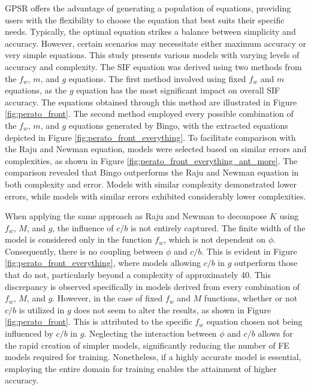 





GPSR offers the advantage of generating a population of equations, providing users with the flexibility to choose the equation that best suits their specific needs. Typically, the optimal equation strikes a balance between simplicity and accuracy. However, certain scenarios may necessitate either maximum accuracy or very simple equations. This study presents various models with varying levels of accuracy and complexity. The SIF equation was derived using two methods from the $f_w$, $m$, and $g$ equations. The first method involved using fixed $f_w$ and $m$ equations, as the $g$ equation has the most significant impact on overall SIF accuracy. The equations obtained through this method are illustrated in Figure \ref{fig:perato_front}. The second method employed every possible combination of the $f_w$, $m$, and $g$ equations generated by Bingo, with the extracted equations depicted in Figure \ref{fig:perato_front_everything}. To facilitate comparison with the Raju and Newman equation, models were selected based on similar errors and complexities, as shown in Figure \ref{fig:perato_front_everything_ant_more}. The comparison revealed that Bingo outperforms the Raju and Newman equation in both complexity and error. Models with similar complexity demonstrated lower errors, while models with similar errors exhibited considerably lower complexities.

When applying the same approach as Raju and Newman to decompose $K$ using $f_w$, $M$, and $g$, the influence of $c/b$ is not entirely captured. The finite width of the model is considered only in the function $f_w$, which is not dependent on $\phi$. Consequently, there is no coupling between $\phi$ and $c/b$. This is evident in Figure \ref{fig:perato_front_everything}, where models allowing $c/b$ in $g$ outperform those that do not, particularly beyond a complexity of approximately 40. This discrepancy is observed specifically in models derived from every combination of $f_w$, $M$, and $g$. However, in the case of fixed $f_w$ and $M$ functions, whether or not $c/b$ is utilized in $g$ does not seem to alter the results, as shown in Figure \ref{fig:perato_front}. This is attributed to the specific $f_w$ equation chosen not being influenced by $c/b$ in $g$. Neglecting the interaction between $\phi$ and $c/b$ allows for the rapid creation of simpler models, significantly reducing the number of FE models required for training. Nonetheless, if a highly accurate model is essential, employing the entire domain for training enables the attainment of higher accuracy.




